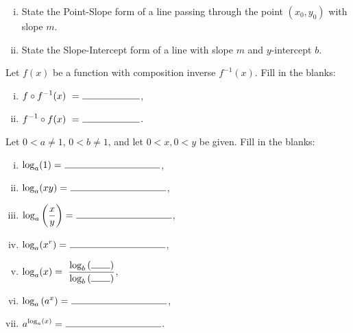 \documentclass[12pt]{amsart}
\begin{document}
\begin{thm}[2 Points]\label{ex1}
  \begin{enumerate}[(i)]
  \item
    State the Point-Slope form of a line passing through the point $(x_0, y_0)$ with slope $m$.
    \vspace{1in}
  \item
    State the Slope-Intercept form of a line with slope $m$ and $y$-intercept $b$.
  \end{enumerate}
\end{thm}

\newpage

\begin{thm}[2 Points]
  Let $f(x)$ be a function with composition inverse $f^{-1}(x)$.
  Fill in the blanks:
  \vspace{.15in}
  \begin{multicols}{2}
    \begin{enumerate}[(i)]
    \item
      $\displaystyle{f \circ f^{-1}(x)\ =\ \line(1,0){60}}$,
    \item
      $\displaystyle{f^{-1} \circ f(x)\ =\ \line(1,0){60}}$.
    \end{enumerate}
  \end{multicols}
\end{thm}

\begin{thm}[7 Points]
  Let $0 < a \neq 1$, $0 < b \neq 1$, and let $0 < x, 0 < y$ be given.
  Fill in the blanks:
  \vspace{.15in}
  \begin{multicols}{2}
    \begin{enumerate}[(i)]
    \item
      $\displaystyle{\log_a(1) =\ \line(1,0){100}}$,
      \vspace{.15in}
    \item
      $\displaystyle{\log_a(xy) =\ \line(1,0){100}}$,
      \vspace{.15in}
      \item
        $\displaystyle{\log_a\left(\frac{x}{y}\right) =\ \line(1,0){100}}$,
        \vspace{.15in}
      \item
        $\displaystyle{\log_a(x^r) =\ \line(1,0){100}}$,
        \vspace{.15in}
      \item
        $\displaystyle{\log_a(x) =\ \frac{\log_b\left(\line(1,0){20}\right)}{\log_b\left(\line(1,0){20}\right)}}$,
        \vspace{.15in}
      \item
        $\displaystyle{\log_a\left(a^x\right) =\ \line(1,0){100}}$,
        \vspace{.15in}
      \item
        $\displaystyle{a^{\log_a(x)} =\ \line(1,0){100}}$.
    \end{enumerate}
  \end{multicols}
\end{thm}
\end{document}
